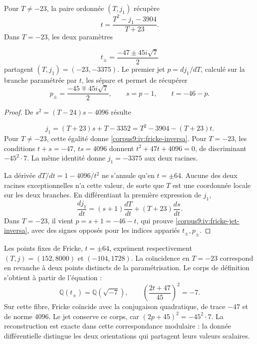 \begin{proposition}
\label{corpus9:iv:fricke-jet}
Pour \(T\ne-23\), la paire ordonnée \((T,j_1)\) récupère
\begin{equation}
 t=\frac{T^2-j_1-3904}{T+23}.
 \label{corpus9:iv:fricke-inversa}
\end{equation}
Dans \(T=-23\), les deux paramètres

\[
 t_\pm=\frac{-47\pm45i\sqrt7}{2}
\]
partagent \((T,j_1)=(-23,-3375)\). Le premier jet
\(p=dj_1/dT\), calculé sur la branche paramétrée par \(t\),
les sépare et permet de récupérer
\begin{equation}
 p_\pm=\frac{-45\mp45i\sqrt7}{2},\qquad
 s=p-1,\qquad t=-46-p.
 \label{corpus9:iv:fricke-jet-inversa}
\end{equation}
\end{proposition}
\begin{proof}
De \(s^2=(T-24)s-4096\) résulte

\[
 j_1=(T+23)s+T-3352
     =T^2-3904-(T+23)t.
\]
Pour \(T\ne-23\), cette égalité donne
\eqref{corpus9:iv:fricke-inversa}. Pour \(T=-23\),
les conditions \(t+s=-47\), \(ts=4096\) donnent
\(t^2+47t+4096=0\), de discriminant \(-45^2\cdot7\).
La même identité donne \(j_1=-3375\) aux deux racines.


La dérivée \(dT/dt=1-4096/t^2\) ne s’annule qu’en
\(t=\pm64\). Aucune des deux racines exceptionnelles n’a cette
valeur, de sorte que \(T\) est une coordonnée locale sur les deux branches.
En différentiant la première expression de \(j_1\),
\[
 \frac{dj_1}{dt}
  =(s+1)\frac{dT}{dt}+(T+23)\frac{ds}{dt}.
\]
Dans \(T=-23\), il vient \(p=s+1=-46-t\), qui prouve
\eqref{corpus9:iv:fricke-jet-inversa}, avec des signes opposés
pour les indices appariés \(t_\pm,p_\pm\).
\end{proof}

Les points fixes de Fricke, \(t=\pm64\), expriment respectivement
\((T,j)=(152,8000)\) et \((-104,1728)\). La coïncidence en
\(T=-23\) correspond en revanche à deux points distincts de la
paramétrisation. Le corps de définition s’obtient à partir de l’équation :
\[
 \mathbb Q(t_\pm)=\mathbb Q(\sqrt{-7}),\qquad
 \left(\frac{2t+47}{45}\right)^2=-7.
\]
Sur cette fibre, Fricke coïncide avec la conjugaison quadratique,
de trace \(-47\) et de norme \(4096\). Le jet conserve ce corps,
car \((2p+45)^2=-45^2\cdot7\). La reconstruction est exacte
dans cette correspondance modulaire : la donnée différentielle distingue
les deux orientations qui partagent leurs valeurs scalaires.
